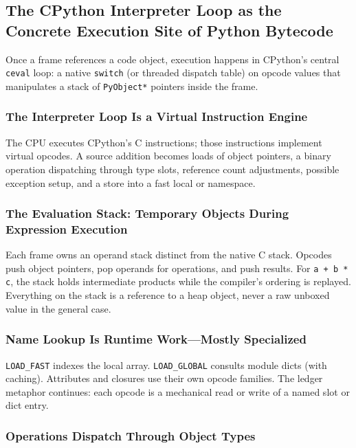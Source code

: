 \subsection{The CPython Interpreter Loop as the Concrete Execution Site of Python Bytecode}

Once a frame references a code object, execution happens in CPython's central \texttt{ceval} loop: a native \texttt{switch} (or threaded dispatch table) on opcode values that manipulates a stack of \texttt{PyObject*} pointers inside the frame.

\subsubsection{The Interpreter Loop Is a Virtual Instruction Engine}

The CPU executes CPython's C instructions; those instructions implement virtual opcodes. A source addition becomes loads of object pointers, a binary operation dispatching through type slots, reference count adjustments, possible exception setup, and a store into a fast local or namespace.

\subsubsection{The Evaluation Stack: Temporary Objects During Expression Execution}

Each frame owns an operand stack distinct from the native C stack. Opcodes push object pointers, pop operands for operations, and push results. For \texttt{a + b * c}, the stack holds intermediate products while the compiler's ordering is replayed. Everything on the stack is a reference to a heap object, never a raw unboxed value in the general case.

\subsubsection{Name Lookup Is Runtime Work---Mostly Specialized}

\texttt{LOAD\_FAST} indexes the local array. \texttt{LOAD\_GLOBAL} consults module dicts (with caching). Attributes and closures use their own opcode families. The ledger metaphor continues: each opcode is a mechanical read or write of a named slot or dict entry.

\subsubsection{Operations Dispatch Through Object Types}

